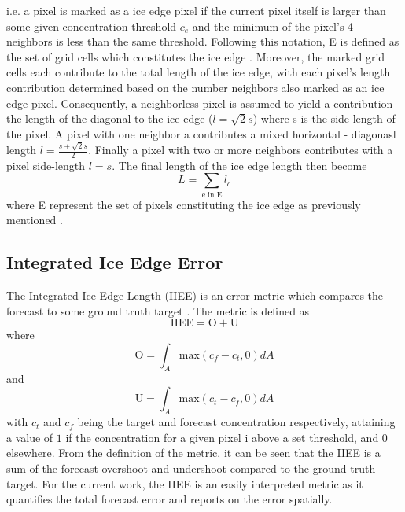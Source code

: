 \documentclass[../main/thesis.tex]{subfiles}
\begin{document}
i.e. a pixel is marked as a ice edge pixel if the current pixel itself is larger than some given concentration threshold $c_e$ and the minimum of the pixel's 4-neighbors is less than the same threshold. Following this notation, E is defined as the set of grid cells which constitutes the ice edge \cite{Melsom2019}. Moreover, the marked grid cells each contribute to the total length of the ice edge, with each pixel's length contribution determined based on the number neighbors also marked as an ice edge pixel. Consequently, a neighborless pixel is assumed to yield a contribution the length of the diagonal to the ice-edge ($l = \sqrt2s$) where s is the side length of the pixel. A pixel with one neighbor a contributes a mixed horizontal - diagonasl length $l = \frac{s + \sqrt2s}{2}$. Finally a pixel with two or more neighbors contributes with a pixel side-length $l = s$. The final length of the ice edge length then become 
\begin{equation}
    L = \sum_\text{e in E} l_c
\end{equation}
where E represent the set of pixels constituting the ice edge as previously mentioned \cite{Melsom2019}.

\subsection{Integrated Ice Edge Error}
The Integrated Ice Edge Length (IIEE) is an error metric which compares the forecast to some ground truth target \cite{Goessling2016}. The metric is defined as 
\begin{equation}
    \label{eq:IIEE}
    \text{IIEE} = \text{O} + \text{U}
\end{equation}
where 
\begin{equation}
    \label{eq:a_plus}
    \text{O} = \int_A\text{max}(c_f - c_t, 0)dA
\end{equation}
and
\begin{equation}
    \label{eq:a_minus}
    \text{U} = \int_A\text{max}(c_t - c_f, 0)dA
\end{equation}
with $c_t$ and $c_f$ being the target and forecast concentration respectively, attaining a value of $1$ if the concentration for a given pixel i above a set threshold, and 0 elsewhere. From the definition of the metric, it can be seen that the IIEE is a sum of the forecast overshoot and undershoot compared to the ground truth target. For the current work, the IIEE is an easily interpreted metric as it quantifies the total forecast error and reports on the error spatially.
\end{document}
